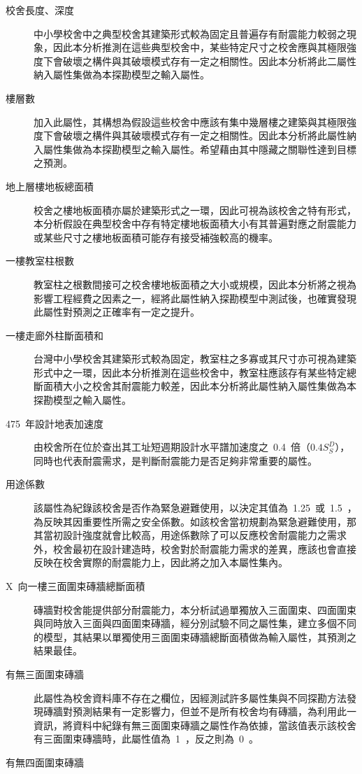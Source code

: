 \begin{description}
  \item[校舍長度、深度]
  中小學校舍中之典型校舍其建築形式較為固定且普遍存有耐震能力較弱之現象，因此本分析推測在這些典型校舍中，某些特定尺寸之校舍應與其極限強度下會破壞之構件與其破壞模式存有一定之相關性。因此本分析將此二屬性納入屬性集做為本探勘模型之輸入屬性。
  \item[樓層數]
  加入此屬性，其構想為假設這些校舍中應該有集中幾層樓之建築與其極限強度下會破壞之構件與其破壞模式存有一定之相關性。因此本分析將此屬性納入屬性集做為本探勘模型之輸入屬性。希望藉由其中隱藏之關聯性達到目標之預測。
  \item[地上層樓地板總面積]
  校舍之樓地板面積亦屬於建築形式之一環，因此可視為該校舍之特有形式，本分析假設在典型校舍中存有特定樓地板面積大小有其普遍對應之耐震能力或某些尺寸之樓地板面積可能存有接受補強較高的機率。
  \item[一樓教室柱根數]
  教室柱之根數間接可之校舍樓地板面積之大小或規模，因此本分析將之視為影響工程經費之因素之一，經將此屬性納入探勘模型中測試後，也確實發現此屬性對預測之正確率有一定之提升。
  \item[一樓走廊外柱斷面積和]
  台灣中小學校舍其建築形式較為固定，教室柱之多寡或其尺寸亦可視為建築形式中之一環，因此本分析推測在這些校舍中，教室柱應該存有某些特定總斷面積大小之校舍其耐震能力較差，因此本分析將此屬性納入屬性集做為本探勘模型之輸入屬性。
  \item[475~年設計地表加速度]
  由校舍所在位於查出其工址短週期設計水平譜加速度之~0.4~倍（$0.4S^D_S$），同時也代表耐震需求，是判斷耐震能力是否足夠非常重要的屬性。
  \item[用途係數]
  該屬性為紀錄該校舍是否作為緊急避難使用，以決定其值為~1.25~或~1.5~，為反映其因重要性所需之安全係數。如該校舍當初規劃為緊急避難使用，那其當初設計強度就會比較高，用途係數除了可以反應校舍耐震能力之需求外，校舍最初在設計建造時，校舍對於耐震能力需求的差異，應該也會直接反映在校舍實際的耐震能力上，因此將之加入本屬性集內。
  \item[X~向一樓三面圍束磚牆總斷面積]
  磚牆對校舍能提供部分耐震能力，本分析試過單獨放入三面圍束、四面圍束與同時放入三面與四面圍束磚牆，經分別試驗不同之屬性集，建立多個不同的模型，其結果以單獨使用三面圍束磚牆總斷面積做為輸入屬性，其預測之結果最佳。
  \item[有無三面圍束磚牆]
  此屬性為校舍資料庫不存在之欄位，因經測試許多屬性集與不同探勘方法發現磚牆對預測結果有一定影響力，但並不是所有校舍均有磚牆，為利用此一資訊，將資料中紀錄有無三面圍束磚牆之屬性作為依據，當該值表示該校舍有三面圍束磚牆時，此屬性值為~1~，反之則為~0~。
  \item[有無四面圍束磚牆]

\end{description}
